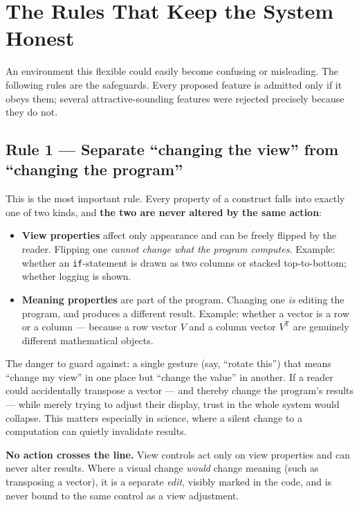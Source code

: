 \documentclass[11pt]{article}
\newcommand{\req}[1]{\textbf{\color{accent}#1}}
\begin{document}
\section{The Rules That Keep the System Honest}
An environment this flexible could easily become confusing or misleading. The following rules are the safeguards. Every proposed feature is admitted only if it obeys them; several attractive-sounding features were rejected precisely because they do not.

\subsection{Rule 1 --- Separate ``changing the view'' from ``changing the program''}
This is the most important rule. Every property of a construct falls into exactly one of two kinds, and \req{the two are never altered by the same action}:

\begin{itemize}[leftmargin=1.4em,itemsep=3pt]
  \item \textbf{View properties} affect only appearance and can be freely flipped by the reader. Flipping one \emph{cannot change what the program computes.} Example: whether an \texttt{if}-statement is drawn as two columns or stacked top-to-bottom; whether logging is shown.
  \item \textbf{Meaning properties} are part of the program. Changing one \emph{is} editing the program, and produces a different result. Example: whether a vector is a row or a column --- because a row vector $V$ and a column vector $V^{\mathsf{T}}$ are genuinely different mathematical objects.
\end{itemize}

The danger to guard against: a single gesture (say, ``rotate this'') that means ``change my view'' in one place but ``change the value'' in another. If a reader could accidentally transpose a vector --- and thereby change the program's results --- while merely trying to adjust their display, trust in the whole system would collapse. This matters especially in science, where a silent change to a computation can quietly invalidate results.

\begin{principle}
\textbf{No action crosses the line.} View controls act only on view properties and can never alter results. Where a visual change \emph{would} change meaning (such as transposing a vector), it is a separate \emph{edit}, visibly marked in the code, and is never bound to the same control as a view adjustment.
\end{principle}
\end{document}
